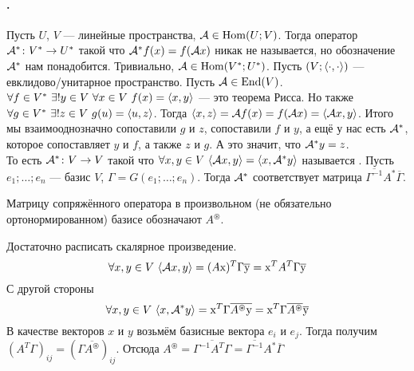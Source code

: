 \documentclass{article}
\begin{document}
    \paragraph{.}
    \begin{itemize}
        \dfn Пусть $U$, $V$ --- линейные пространства, ${\mathcal{A}}\in\operatorname{Hom}(U;V)$. Тогда оператор ${\mathcal{A}}^*\colon V^*\to U^*$ такой что ${\mathcal{A}}^*f(x)=f({\mathcal{A}} x)$ никак не называется, но обозначение ${\mathcal{A}}^*$ нам понадобится.
        \thm Тривиально, ${\mathcal{A}}\in\operatorname{Hom}(V^*;U^*)$.
        \dfn Пусть $(V;{\left\langle{\cdot},{\cdot}\right\rangle})$ --- евклидово/унитарное пространство. Пусть ${\mathcal{A}}\in\operatorname{End}(V)$. $\forall f\in V^*~\exists!y\in V~\forall x\in V~f(x)={\left\langle{x},{y}\right\rangle}$ --- это теорема Рисса. Но также $\forall g\in V^*~\exists!z\in V~g(u)={\left\langle{u},{z}\right\rangle}$. Тогда ${\left\langle{x},{z}\right\rangle}={\mathcal{A}} f(x)=f({\mathcal{A}} x)={\left\langle{{\mathcal{A}}x},{y}\right\rangle}$. Итого мы взаимооднозначно сопоставили $g$ и $z$, сопоставили $f$ и $y$, а ещё у нас есть ${\mathcal{A}}^*$, которое сопоставляет $y$ и $f$, а также $z$ и $g$. А это значит, что ${\mathcal{A}}^*y=z$.\\
        То есть ${\mathcal{A}}^*\colon V\to V$ такой что $\forall x,y\in V~{\left\langle{{\mathcal{A}}x},{y}\right\rangle}={\left\langle{x},{{\mathcal{A}}^*y}\right\rangle}$ называется .
        \thm Пусть $e_1;\ldots;e_n$ --- базис $V$, $\Gamma=G(e_1;\ldots;e_n)$. Тогда ${\mathcal{A}}^*$ соответствует матрица $\overline{\Gamma^{-1}}A^*\overline\Gamma$.
        \begin{Comment}
            Матрицу сопряжённого оператора в произвольном (не обязательно ортонормированном) базисе обозначают $A^\circledast$.
        \end{Comment}
        \begin{Proof}
            Достаточно расписать скалярное произведение.
            $$
            \forall x,y\in V~{\left\langle{{\mathcal{A}}x},{y}\right\rangle}=(A\mathrm x)^T\Gamma\overline{\mathrm y}=\mathrm x^TA^T\Gamma\overline{\mathrm y}
            $$
            С другой стороны
            $$
            \forall x,y\in V~{\left\langle{x},{{\mathcal{A}}^*y}\right\rangle}=\mathrm x^T\Gamma\overline{A^\circledast\mathrm y}=\mathrm x^T\Gamma\overline{A^\circledast}\overline{\mathrm y}
            $$
            В качестве векторов $x$ и $y$ возьмём базисные вектора $e_i$ и $e_j$. Тогда получим $(A^T\Gamma)_{ij}=(\Gamma\overline{A^\circledast})_{ij}$. Отсюда $A^\circledast=\overline{\Gamma^{-1}A^T\Gamma}=\overline{\Gamma^{-1}}A^*\overline{\Gamma}$
        \end{Proof}
        \begin{Comment}

\end{Comment}
\end{itemize}
\end{document}
